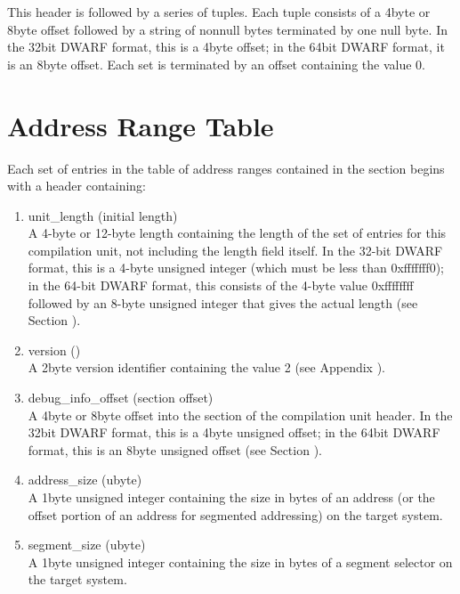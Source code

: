 This header is followed by a series of tuples. Each tuple
consists of a 4\dash byte or 8\dash byte offset followed by a string
of non\dash null bytes terminated by one null byte. 
In the 32\dash bit
DWARF format, this is a 4\dash byte offset; in the 64\dash bit DWARF
format, it is an 8\dash byte offset. 
Each set is terminated by an
offset containing the value 0.


\section{Address Range Table}
\label{datarep:addrssrangetable}

Each set of entries in the table of address ranges contained
in the 
section begins with a header containing:

\begin{enumerate}[1.]

\item unit\_length (initial length) \\
A 4-byte or 12-byte length containing the length of the
set of entries for this compilation unit, not including the
length field itself. In the 32-bit DWARF format, this is a
4-byte unsigned integer (which must be less than 0xfffffff0);
in the 64-bit DWARF format, this consists of the 4-byte value
0xffffffff followed by an 8-byte unsigned integer that gives
the actual length 
(see Section ).

\item version () \\
A 2\dash byte version identifier
 containing the value 2 
(see Appendix ). 

\item debug\_info\_offset (section offset) \\
A 
4\dash byte or 8\dash byte offset into the 
 section of
the compilation unit header. In the 32\dash bit DWARF format,
this is a 4\dash byte unsigned offset; in the 64\dash bit DWARF format,
this is an 8\dash byte unsigned offset 
(see Section ).

\item address\_size (ubyte) \\
A 1\dash byte unsigned integer containing the size in bytes of an
address 
(or the offset portion of an address for segmented
addressing) on the target system.

\item segment\_size (ubyte) \\
A 
1\dash byte unsigned integer containing the size in bytes of a
segment selector on the target system.

\end{enumerate}

